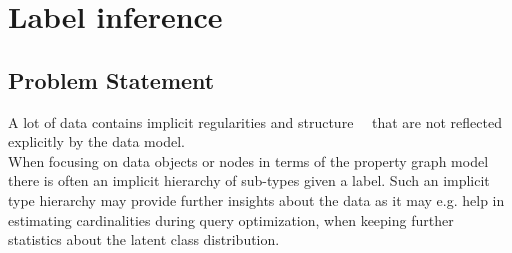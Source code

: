 \chapter{Label inference}
\section{Problem Statement}\label{\positionnumber}
A lot of data contains implicit regularities and structure~\cite{mitchell2006discipline}~\cite{carlsson2009topology} that are not reflected explicitly by the data model.\\
When focusing on data objects or nodes in terms of the property graph model there is often an implicit hierarchy of sub-types given a label. Such an implicit type hierarchy may provide further insights about the data as it may e.g. help in estimating cardinalities during query optimization, when keeping further statistics about the latent class distribution. \\



